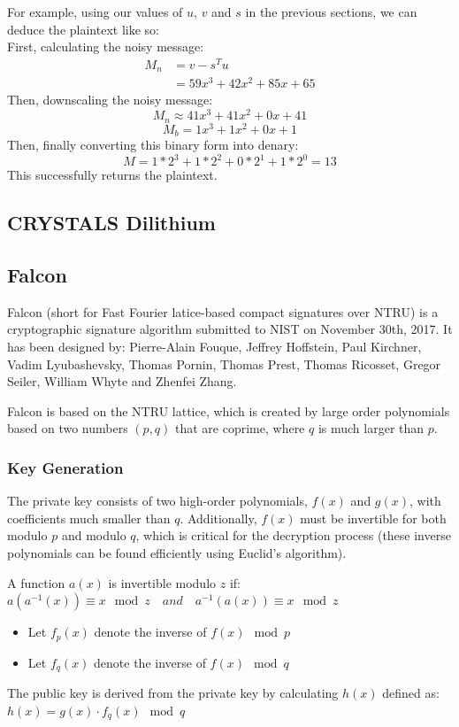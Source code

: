 \documentclass{article}
\begin{document}
For example, using our values of $u$, $v$ and $s$ in the previous sections, we can deduce the plaintext like so:
\\
First, calculating the noisy message:
\begin{align*}
M_{n} &= v - s^{T}u \\
&= 59x^{3} + 42x^{2} + 85x + 65
\end{align*}
Then, downscaling the noisy message:
\[M_{n} \approx 41x^{3} + 41x^{2} + 0x + 41\]
\[M_{b} = 1x^{3} + 1x^{2} + 0x + 1\]
Then, finally converting this binary form into denary:
\[M = 1 * 2^{3} + 1 * 2^{2} + 0 * 2^{1} + 1 * 2^{0} = 13\]
This successfully returns the plaintext.

\subsection{CRYSTALS Dilithium}
\subsection{Falcon}
Falcon (short for Fast Fourier latice-based compact signatures over NTRU) is a
cryptographic signature algorithm submitted to NIST on November 30th, 2017. It
has been designed by: Pierre-Alain Fouque, Jeffrey Hoffstein, Paul Kirchner,
Vadim Lyubashevsky, Thomas Pornin, Thomas Prest, Thomas Ricosset, Gregor
Seiler, William Whyte and Zhenfei Zhang.

\medskip
Falcon is based on the NTRU lattice, which is created by large order
polynomials based on two numbers $(p,q)$ that are coprime, where $q$ is much larger
than $p$.

\subsubsection{Key Generation}

The private key consists of two high-order polynomials, $f(x)$ and $g(x)$, with
coefficients much smaller than $q$. Additionally, $f(x)$ must be invertible for
both modulo $p$ and modulo $q$, which is critical for the decryption process (these
inverse polynomials can be found efficiently using Euclid's algorithm).

A function $a(x)$ is invertible modulo $z$ if:\\
$a(a^{-1}(x)) \equiv x \mod{z} \quad and \quad a^{-1}(a(x)) \equiv x \mod{z}$
\\
\begin{itemize}
   \item Let $f_{p}(x)$ denote the inverse of $f(x) \mod{p}$
   \item Let $f_{q}(x)$ denote the inverse of $f(x) \mod{q}$
\end{itemize}
The public key is derived from the private key by calculating $h(x)$ defined as:\\
$h(x) = g(x) \cdot f_{q}(x) \mod{q}$
\end{document}
